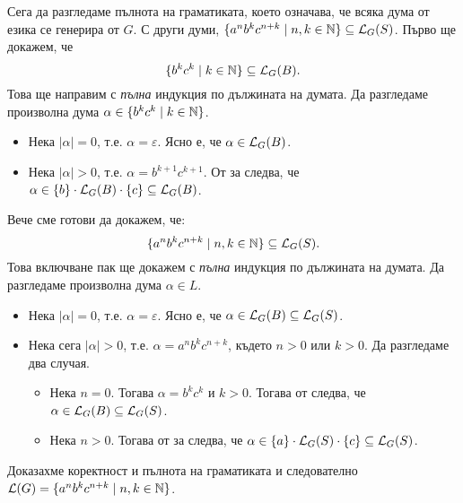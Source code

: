 \begin{extra}
\begin{example}
    Сега да разгледаме пълнота на граматиката, което означава, че
    всяка дума от езика се генерира от $G$. С други думи, $\{a^nb^kc^{n+k} \mid n,k\in\mathbb{N}\} \subseteq \mathcal{L}_G(S)$.
    Първо ще докажем, че
    \begin{equation}
      \label{eq:4}
      \{b^kc^k \mid k \in \mathbb{N}\} \subseteq \mathcal{L}_G(B).
    \end{equation}
    Това ще направим с \emph{пълна} индукция по дължината на думата.
    Да разгледаме произволна дума $\alpha \in \{b^kc^k \mid k \in \mathbb{N}\}$.
    \begin{itemize}
    \item
      Нека $|\alpha| = 0$, т.е. $\alpha = \varepsilon$.
      Ясно е, че $\alpha \in \mathcal{L}_G(B)$.
    \item
      Нека $|\alpha| > 0$, т.е. $\alpha = b^{k+1}c^{k+1}$.
      От \IndHyp за  следва, че $\alpha \in \{b\} \cdot \mathcal{L}_G(B) \cdot \{c\} \subseteq \mathcal{L}_G(B)$.
    \end{itemize}
    Вече сме готови да докажем, че:
    \begin{equation}
      \label{eq:9}
      \{a^nb^kc^{n+k} \mid n,k \in \mathbb{N}\} \subseteq \mathcal{L}_G(S).
    \end{equation}
    Това включване пак ще докажем с \emph{пълна} индукция по дължината на думата.
    Да разгледаме произволна дума $\alpha \in L$. 
    \begin{itemize}
    \item
      Нека $|\alpha| = 0$, т.е. $\alpha = \varepsilon$.
      Ясно е, че $\alpha \in \mathcal{L}_G(B) \subseteq \mathcal{L}_G(S)$.
    \item
      Нека сега $|\alpha| > 0$, т.е. $\alpha = a^nb^kc^{n+k}$, където $n > 0$ или $k > 0$. Да разгледаме два случая.
      \begin{itemize}
      \item
        Нека $n = 0$. Тогава $\alpha = b^kc^k$ и $k > 0$. Тогава от 
        следва, че $\alpha \in \mathcal{L}_G(B) \subseteq \mathcal{L}_G(S)$.
      \item                   
        Нека $n > 0$. Тогава от \IndHyp за  следва, че
        $\alpha \in \{a\} \cdot \mathcal{L}_G(S) \cdot \{c\} \subseteq \mathcal{L}_G(S)$.
      \end{itemize}
    \end{itemize}
    Доказахме коректност и пълнота на граматиката и следователно $\mathcal{L}(G) = \{a^nb^kc^{n+k} \mid n,k\in\mathbb{N}\}$.
  \end{example}
  

\end{extra}
